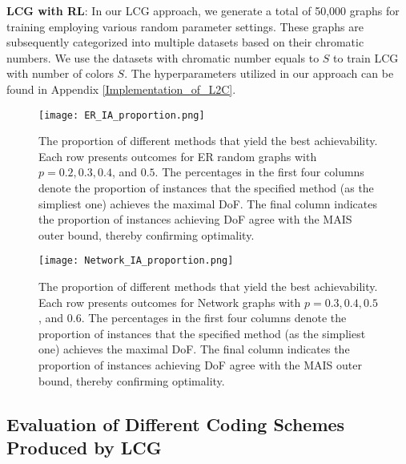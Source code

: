 \documentclass[a4paper,journal]{IEEEtran}
\begin{document}
\textbf{LCG with RL}:
In our LCG approach, we generate a total of 50,000 graphs for training employing various random parameter settings. These graphs are subsequently categorized into multiple datasets based on their chromatic numbers. We use the datasets with chromatic number equals to $S$ to train LCG with number of colors $S$. The hyperparameters utilized in our approach can be found in Appendix \ref{Implementation_of_L2C}. 


\begin{figure}[htbp]
	\begin{center}
 \texttt{[image: ER\_IA\_proportion.png]}
	\end{center}
	\caption{The proportion of different methods that yield the best achievability. Each row presents outcomes for ER random graphs with $p=0.2, 0.3, 0.4$, and $0.5$. The percentages in the first four columns denote the proportion of instances that the specified method (as the simpliest one) achieves the maximal DoF. The final column indicates the proportion of instances achieving DoF agree with the MAIS outer bound, thereby confirming optimality.}
	 \label{ER_IA_proportion}
\end{figure}
% 
\begin{figure}[htbp]
	\begin{center}
 \texttt{[image: Network\_IA\_proportion.png]}
	\end{center}
	\caption{The proportion of different methods that yield the best achievability. Each row presents outcomes for Network graphs with $p=0.3, 0.4, 0.5$, and $0.6$. The percentages in the first four columns denote the proportion of instances that the specified method (as the simpliest one) achieves the maximal DoF. The final column indicates the proportion of instances achieving DoF agree with the MAIS outer bound, thereby confirming optimality.}
	\label{Network_IA_proportion}
\end{figure}

\subsection{Evaluation of Different Coding Schemes Produced by LCG}
\end{document}
